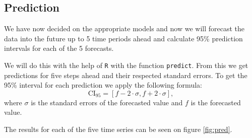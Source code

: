 \documentclass{article}
\begin{document}
\subsection{Prediction}

We have now decided on the appropriate models and now we will
forecast the data into the future up to 5 time periods
ahead and calculate 95\% prediction intervals for each of the 5 forecasts.

We will do this with the help of  \verb|R| with the function \verb|predict|.
From this we get predictions for five steps ahead and their 
respected standard errors. To get the 
95\% interval for each prediction we apply the following formula:
$$\text{CI}_{95} = [f - 2 \cdot \sigma, f + 2 \cdot \sigma],$$
where $\sigma$ is the standard errors of the forecasted value and 
$f$ is the forecasted value. 

The results for each of the five time series can be seen on figure 
\ref{fig:pred}. 
\end{document}
